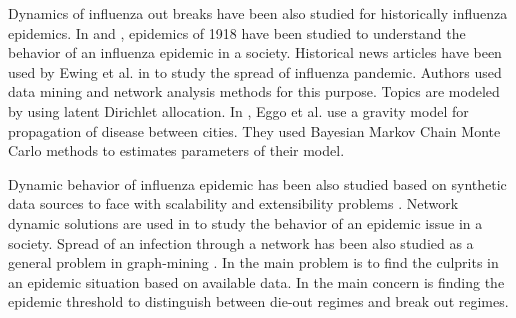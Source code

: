 Dynamics of influenza out breaks have been also studied for historically
influenza epidemics. In \cite{ref8} and \cite{ref12}, epidemics of 1918
have been studied to understand the behavior of an influenza epidemic in
a society. Historical news articles have been used by Ewing et al. in
\cite{ref8} to study the spread of influenza pandemic. Authors used data
mining and network analysis methods for this purpose. Topics are modeled
by using latent Dirichlet allocation. In \cite{ref12}, Eggo et al. use a
gravity model for propagation of disease between cities. They used
Bayesian Markov Chain Monte Carlo methods to estimates parameters of
their model. 

Dynamic behavior of influenza epidemic has been also studied based on
synthetic data sources to face with scalability and extensibility
problems \cite{ref11}. Network dynamic solutions are used in
\cite{ref11} to study the behavior of an epidemic issue in a society.
Spread of an infection through a network has been also studied as a
general problem in graph-mining \cite{ref13} \cite{ref14}. In
\cite{ref14} the main problem is to find the culprits in an epidemic
situation based on available data. In \cite{ref13} the main concern is
finding the epidemic threshold to distinguish between die-out regimes
and break out regimes.
